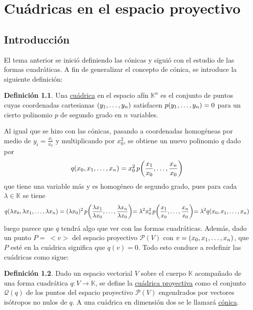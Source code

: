 \documentclass[12pt]{report}
\theoremstyle{definition}
\newtheorem{definition}{Definición}[chapter]
\theoremstyle{definition}
\theoremstyle{remark}
\begin{document}
\chapter{Cuádricas en el espacio proyectivo}

\section{Introducción}

El tema anterior se inició definiendo las cónicas y siguió con el estudio de las formas cuadráticas. A fin de generalizar el concepto de cónica, se introduce la siguiente definición:

\begin{definition}
\label{def5.1.}
Una \ul{cuádrica} en el espacio afín $\mathbb{K}^n$ es el conjunto de puntos cuyas coordenadas cartesianas $(y_1,\mathellipsis,y_n)$ satisfacen $p(y_1,\mathellipsis,y_n) = 0$ para un cierto polinomio $p$ de segundo grado en $n$ variables.
\end{definition}

Al igual que se hizo con las cónicas, pasando a coordenadas homogéneas por medio de $y_i = \frac{x_i}{x_0}$ y multiplicando por $x_0^2$, se obtiene un nuevo polinomio $q$ dado por
\[q(x_0,x_1,\mathellipsis,x_n) = x_0^2 \, p\biggr(\frac{x_1}{x_0},\mathellipsis,\frac{x_n}{x_0} \biggl)\]
que tiene una variable más y es homogéneo de segundo grado, pues para cada $\lambda \in \mathbb{K}$ se tiene
\[q(\lambda x_0,\lambda x_1,\mathellipsis, \lambda x_n) = (\lambda x_0)^2 \, p\biggr(\frac{\lambda x_1}{\lambda x_0},\mathellipsis,\frac{\lambda x_n}{\lambda x_0} \biggl) = \lambda^2 x_0^2 \, p\biggr(\frac{x_1}{x_0},\mathellipsis,\frac{x_n}{x_0} \biggl) = \lambda^2q(x_0,x_1,\mathellipsis,x_n)\]
luego parece que $q$ tendrá algo que ver con las formas cuadráticas. Además, dado un punto $P = \ <v>$ del espacio proyectivo $\mathcal{P}(V)$ con $v = (x_0,x_1,\mathellipsis,x_n)$, que $P$ esté en la cuádrica significa que $q(v) = 0$. Todo esto conduce a redefinir las cuádricas como sigue:

\begin{definition}
\label{def5.2.}
Dado un espacio vectorial $V$ sobre el cuerpo $\mathbb{K}$ acompañado de una forma cuadrática $q \colon V \to \mathbb{K}$, se define la \ul{cuádrica proyectiva} como el conjunto $\mathcal{Q}(q)$ de los puntos del espacio proyectivo $\mathcal{P}(V)$ engendrados por vectores isótropos no nulos de $q$. A una cuádrica en dimensión dos se le llamará \ul{cónica}.
\end{definition}
\end{document}
